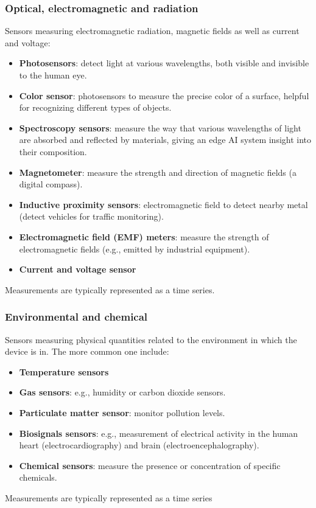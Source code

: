 \documentclass{article}
\begin{document}
        \subsubsection{Optical, electromagnetic and radiation}
          Sensors measuring electromagnetic radiation, magnetic fields as well as current and voltage:
          \begin{itemize}
            \item \textbf{Photosensors}: detect light at various wavelengths, both visible and invisible to the human eye.
            \item \textbf{Color sensor}: photosensors to measure the precise color of a surface, helpful for recognizing different types of objects.
            \item \textbf{Spectroscopy sensors}: measure the way that various wavelengths of light are absorbed and reflected by materials, giving an edge AI system insight into their composition.
            \item \textbf{Magnetometer}: measure the strength and direction of magnetic fields (a digital compass).
            \item \textbf{Inductive proximity sensors}: electromagnetic field to detect nearby metal (detect vehicles for traffic monitoring).
            \item \textbf{Electromagnetic field (EMF) meters}: measure the strength of electromagnetic fields (e.g., emitted by industrial equipment).
            \item \textbf{Current and voltage sensor}
          \end{itemize}
          Measurements are typically represented as a time series.
        \subsubsection{Environmental and chemical}
          Sensors measuring physical quantities related to the environment in which the device is in. The more common one include:
          \begin{itemize}
            \item \textbf{Temperature sensors}
            \item \textbf{Gas sensors}: e.g., humidity or carbon dioxide sensors.
            \item \textbf{Particulate matter sensor}: monitor pollution levels.
            \item \textbf{Biosignals sensors}: e.g., measurement of electrical activity in the human heart (electrocardiography) and brain (electroencephalography).
            \item \textbf{Chemical sensors}: measure the presence or concentration of specific chemicals.
          \end{itemize}
          Measurements are typically represented as a time series
\end{document}
